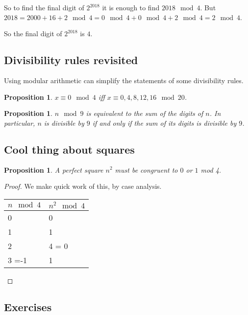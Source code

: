 \documentclass[11pt]{article}
\newtheorem{prop}[thm]{Proposition}
\theoremstyle{definition}
\numberwithin{thm}{section}
\begin{document}
So to find the final digit of $2^{2018}$ it is enough to find $2018 \mod 4$. But $2018 = 2000 + 16 +2 \mod 4 = 0 \mod 4 + 0 \mod 4 + 2 \mod 4 = 2 \mod 4$.

So the final digit of $2^{2018}$ is $4$.

\subsection{Divisibility rules revisited}

Using modular arithmetic can simplify the statements of some divisibility rules.

\begin{prop} $x \equiv 0 \mod 4$ iff $x \equiv 0,4,8,12,16 \mod 20$.
\end{prop}

\begin{prop} $n \mod 9$ is equivalent to the sum of the digits of $n$. In particular, $n$ is divisible by $9$ if and only if the sum of its digits is divisible by $9$.
\end{prop}

\subsection{Cool thing about squares}

\begin{prop} A perfect square $n^2$ must be congruent to $0$ or $1$ mod 4.
\end{prop}

\begin{proof} We make quick work of this, by case analysis.

\begin{table}[!ht]
\begin{tabular}{l|l}
$n \mod 4$ & $n^2 \mod 4$ \\ \hline
0          & 0           \\
1          & 1           \\
2          & 4 = 0        \\
3 =-1      & 1          
\end{tabular}
\end{table}
\end{proof}

\subsection{Exercises}
\end{document}
